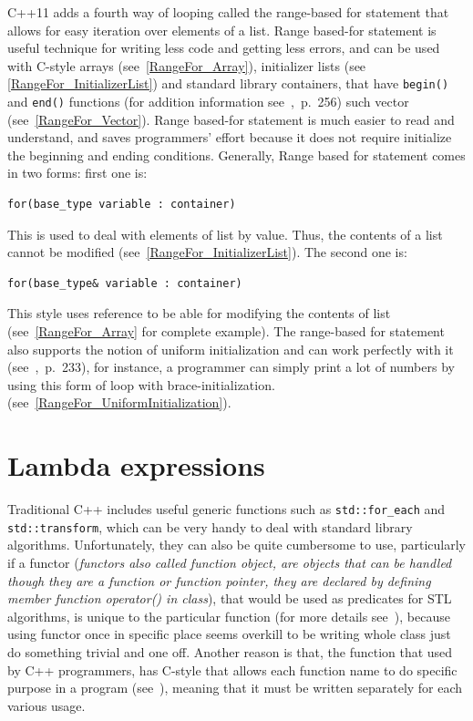 \documentclass[11pt]{report}
\begin{document}
C++11 adds a fourth way of looping called the range-based for statement that allows for easy iteration over elements of a list. Range based-for statement is useful technique for writing less code and getting less errors, and can be used with C-style arrays (see~\ref{RangeFor_Array}), initializer lists (see \ref{RangeFor_InitializerList}) and standard library containers, that have \texttt{begin()} and \texttt{end()} functions (for addition information see~\cite{Overland:2011:CWF},~p.~256) such vector (see~\ref{RangeFor_Vector}). Range based-for statement is much easier to read and understand, and saves programmers' effort because it does not require initialize the beginning and ending conditions. Generally, Range based for statement comes in two forms: first one is:
\begin{lstlisting}
for(base_type variable : container)
\end{lstlisting} 
This is used to deal with elements of list by value. Thus, the contents of a list cannot be modified (see~\ref{RangeFor_InitializerList}). The second one is:
\begin{lstlisting}
for(base_type& variable : container)
\end{lstlisting}
This style uses reference to be able for modifying the contents of list (see~\ref{RangeFor_Array} for complete example). The range-based for statement also supports the notion of uniform initialization and can work perfectly with it (see~\cite{Prata:2012:Cpp},~p.~233), for instance, a programmer can simply print a lot of numbers by using this form of loop with brace-initialization. (see~\ref{RangeFor_UniformInitialization}).

\section{Lambda expressions}
\label{section: Lambda Expressions}
Traditional C++ includes useful generic functions such as \texttt{std::for\_each} and \texttt{std::transform}, which can be very handy to deal with standard library algorithms. Unfortunately, they can also be quite cumbersome to use, particularly if a functor (\emph{functors also called function object, are objects that can be handled though they are a function or function pointer, they are declared by defining member function operator() in class}), that would be used as predicates for STL algorithms, is unique to the particular function (for more details see~\cite{Allain:2011:FutureCpp}), because using functor once in specific place seems overkill to be writing whole class just do something trivial and one off. Another reason is that, the function that used by C++ programmers, has C-style that allows each function name to do specific purpose in a program (see~\cite{Cppreference:2012:Cpp11}), meaning that it must be written separately for each various usage.
\end{document}
